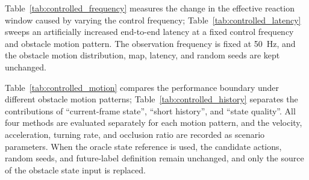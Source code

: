 \documentclass[10pt,a4paper,twocolumn]{article}
\begin{document}
Table~\ref{tab:controlled_frequency} measures the change in the effective reaction window caused by varying the control frequency; Table~\ref{tab:controlled_latency} sweeps an artificially increased end-to-end latency at a fixed control frequency and obstacle motion pattern. The observation frequency is fixed at 50~Hz, and the obstacle motion distribution, map, latency, and random seeds are kept unchanged.

Table~\ref{tab:controlled_motion} compares the performance boundary under different obstacle motion patterns; Table~\ref{tab:controlled_history} separates the contributions of ``current-frame state'', ``short history'', and ``state quality''. All four methods are evaluated separately for each motion pattern, and the velocity, acceleration, turning rate, and occlusion ratio are recorded as scenario parameters. When the oracle state reference is used, the candidate actions, random seeds, and future-label definition remain unchanged, and only the source of the obstacle state input is replaced.
\end{document}
